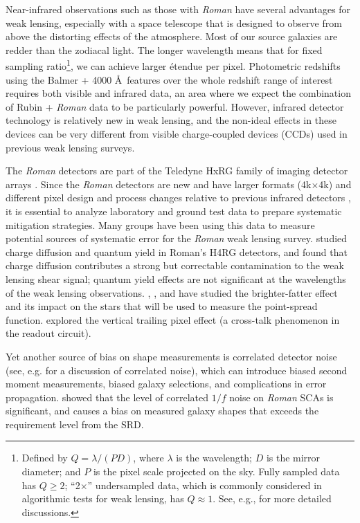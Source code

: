 \documentclass[]{pasj01}
\begin{document}
Near-infrared observations such as those with \textit{Roman} have several advantages for weak lensing, especially with a space telescope that is designed to observe from above the distorting effects of the atmosphere. Most of our source galaxies are redder than the zodiacal light. The longer wavelength means that for fixed sampling ratio\footnote{Defined by $Q = \lambda/(PD)$, where $\lambda$ is the wavelength; $D$ is the mirror diameter; and $P$ is the pixel scale projected on the sky. Fully sampled data has $Q\ge 2$; ``2$\times$'' undersampled data, which is commonly considered in algorithmic tests for weak lensing, has $Q\approx 1$. See, e.g., \citet{Kannawadi2021, Finner2023, Hirata2024} for more detailed discussions.}, we can achieve larger \'etendue per pixel. Photometric redshifts using the Balmer + 4000 \AA\ features over the whole redshift range of interest requires both visible and infrared data, an area where we expect the combination of Rubin + \textit{Roman} data to be particularly powerful. However, infrared detector technology is relatively new in weak lensing, and the non-ideal effects in these devices can be very different from visible charge-coupled devices (CCDs) used in previous weak lensing surveys.

The \textit{Roman} detectors are part of the Teledyne HxRG family of imaging detector arrays \citep{Blank2011}. Since the \textit{Roman} detectors are new and have larger formats (4k$\times$4k) and different pixel design and process changes relative to previous infrared detectors \citep{Mosby2020}, it is essential to analyze laboratory and ground test data to prepare systematic mitigation strategies. Many groups have been using this data to measure potential sources of systematic error for the \textit{Roman} weak lensing survey. \citet{Givans2022} studied charge diffusion and quantum yield in Roman's H4RG detectors, and found that charge diffusion contributes a strong but correctable contamination to the weak lensing shear signal; quantum yield effects are not significant at the wavelengths of the weak lensing observations. \citet{Choi2020}, \citet{PlazasMalagon2024}, and \citet{Paine2025} have studied the brighter-fatter effect and its impact on the stars that will be used to measure the point-spread function. \citet{Freudenburg2020} explored the vertical trailing pixel effect (a cross-talk phenomenon in the readout circuit).

Yet another source of bias on shape measurements is correlated detector noise (see, e.g. \cite{Rauscher2011} for a discussion of correlated noise), which can introduce biased second moment measurements, biased galaxy selections, and complications in error propagation. \citet{Laliotis2024} showed that the level of correlated $1/f$ noise on \textit{Roman} SCAs is significant, and causes a bias on measured galaxy shapes that exceeds the requirement level from the SRD. 
\end{document}
